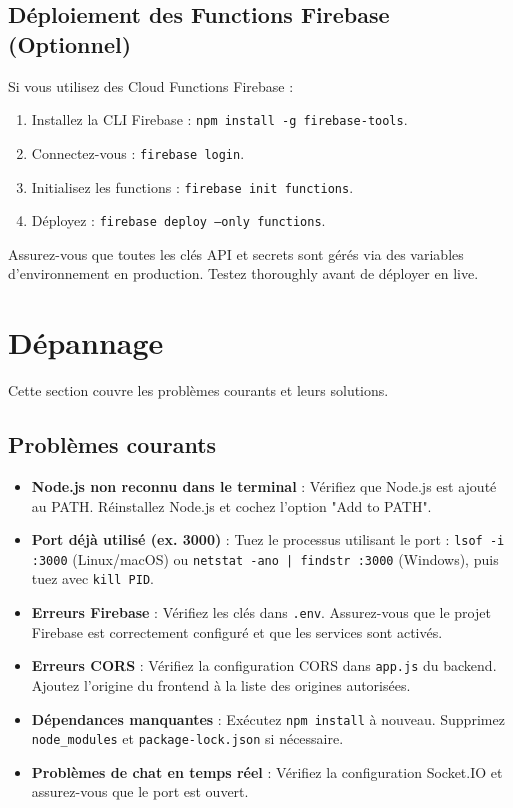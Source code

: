 \documentclass[12pt, a4paper]{article}
\begin{document}
\subsection{Déploiement des Functions Firebase (Optionnel)}
Si vous utilisez des Cloud Functions Firebase :
\begin{stepbox}
\begin{enumerate}
  \item Installez la CLI Firebase : \texttt{npm install -g firebase-tools}.
  \item Connectez-vous : \texttt{firebase login}.
  \item Initialisez les functions : \texttt{firebase init functions}.
  \item Déployez : \texttt{firebase deploy --only functions}.
\end{enumerate}
\end{stepbox}

\begin{warningbox}
Assurez-vous que toutes les clés API et secrets sont gérés via des variables d'environnement en production. Testez thoroughly avant de déployer en live.
\end{warningbox}

\section{Dépannage}
\label{sec:troubleshooting}
Cette section couvre les problèmes courants et leurs solutions.

\subsection{Problèmes courants}
\begin{itemize}
  \item \textbf{Node.js non reconnu dans le terminal} : Vérifiez que Node.js est ajouté au PATH. Réinstallez Node.js et cochez l'option "Add to PATH".
  \item \textbf{Port déjà utilisé (ex. 3000)} : Tuez le processus utilisant le port : \texttt{lsof -i :3000} (Linux/macOS) ou \texttt{netstat -ano | findstr :3000} (Windows), puis tuez avec \texttt{kill PID}.
  \item \textbf{Erreurs Firebase} : Vérifiez les clés dans \texttt{.env}. Assurez-vous que le projet Firebase est correctement configuré et que les services sont activés.
  \item \textbf{Erreurs CORS} : Vérifiez la configuration CORS dans \texttt{app.js} du backend. Ajoutez l'origine du frontend à la liste des origines autorisées.
  \item \textbf{Dépendances manquantes} : Exécutez \texttt{npm install} à nouveau. Supprimez \texttt{node_modules} et \texttt{package-lock.json} si nécessaire.
  \item \textbf{Problèmes de chat en temps réel} : Vérifiez la configuration Socket.IO et assurez-vous que le port est ouvert.
\end{itemize}
\end{document}
